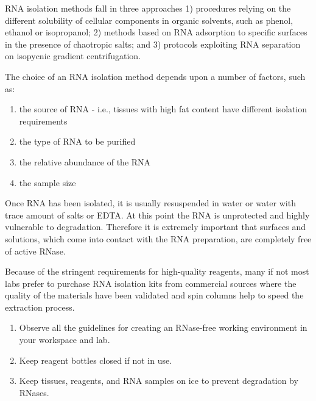 \documentclass[11pt, oneside]{article}
\begin{document}
		\vspace{3mm}
		
		\noindent RNA isolation methods fall in three approaches 1) procedures relying on the different solubility of cellular components in organic solvents, 		such as phenol, ethanol or isopropanol; 2) methods based on RNA adsorption to specific surfaces in the presence of chaotropic salts; and 3) 			protocols exploiting RNA separation on isopycnic gradient centrifugation. 
		
		\vspace{3mm}
		
		\noindent The choice of an RNA isolation method depends upon a number of factors, such as: 
		
		\begin{enumerate}
			\itemsep0mm
			\item the source of RNA - i.e., tissues with high fat content have different isolation requirements 
			\item the type of RNA to be purified 
			\item the relative abundance of the RNA 
			\item the sample size 
		\end{enumerate}

		\noindent Once RNA has been isolated, it is usually resuspended in water or water with trace amount of salts or EDTA. At this point the RNA is 		unprotected and highly vulnerable to degradation. Therefore it is extremely important that surfaces and solutions, which come into contact with the 		RNA 	preparation, are completely free of active RNase. 
		
		\vspace{3mm}
		
		\noindent Because of the stringent requirements for high-quality reagents, many if not most labs prefer to purchase RNA isolation kits from 			commercial sources where the quality of the materials have been validated and spin columns help to speed the extraction process.

		\vspace{3mm}
		

		\begin{enumerate}
			\itemsep0mm
			\item Observe all the guidelines for creating an RNase-free working environment in your workspace and lab. 
			\item Keep reagent bottles closed if not in use. 
			\item Keep tissues, reagents, and RNA samples on ice to prevent degradation by RNases.  
		\end{enumerate}
		
\end{document}
